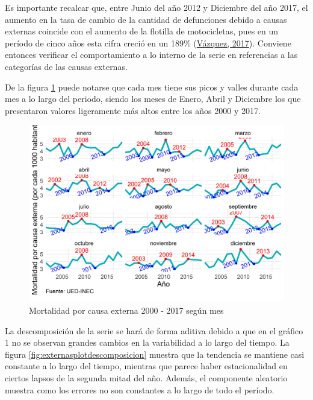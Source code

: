 \documentclass[
]{article}
\begin{document}
Es importante recalcar que, entre Junio del año 2012 y Diciembre del año
2017, el aumento en la tasa de cambio de la cantidad de defunciones
debido a causas externas coincide con el aumento de la flotilla de
motocicletas, pues en un período de cinco años esta cifra creció en un
189\% (\protect\hyperlink{ref-motos}{Vázquez, 2017}). Conviene entonces
verificar el comportamiento a lo interno de la serie en referencias a
las categorías de las causas externas.

De la figura \ref{fig:externasplotperiodos} puede notarse que cada mes
tiene sus picos y valles durante cada mes a lo largo del periodo, siendo
los meses de Enero, Abril y Diciembre los que presentaron valores
ligeramente más altos entre los años 2000 y 2017.

\begin{figure}[H]
\includegraphics[width=1\linewidth,height=1\textheight]{Tesis_files/figure-latex/externasplotperiodos-1} \caption{Mortalidad por causa externa 2000 - 2017 según mes}\label{fig:externasplotperiodos}
\end{figure}

La descomposición de la serie se hará de forma aditiva debido a que en
el gráfico 1 no se observan grandes cambios en la variabilidad a lo
largo del tiempo. La figura \ref{fig:externasplotdescomposicion} muestra
que la tendencia se mantiene casi constante a lo largo del tiempo,
mientras que parece haber estacionalidad en ciertos lapsos de la segunda
mitad del año. Además, el componente aleatorio muestra como los errores
no son constantes a lo largo de todo el período.
\end{document}
